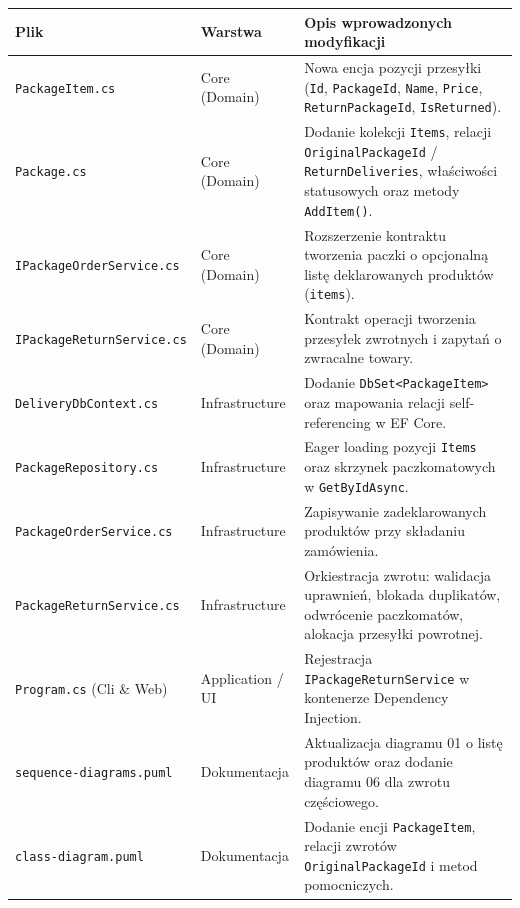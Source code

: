 \documentclass[10.5pt,a4paper]{article}
\begin{document}
\begin{table}[h!]
\centering
\footnotesize
\begin{tabularx}{\textwidth}{l p{3.0cm} X}
\toprule
\textbf{Plik} & \textbf{Warstwa} & \textbf{Opis wprowadzonych modyfikacji} \\
\midrule
\texttt{PackageItem.cs} & Core (Domain) & Nowa encja pozycji przesyłki (\texttt{Id}, \texttt{PackageId}, \texttt{Name}, \texttt{Price}, \texttt{ReturnPackageId}, \texttt{IsReturned}). \\
\addlinespace
\texttt{Package.cs} & Core (Domain) & Dodanie kolekcji \texttt{Items}, relacji \texttt{OriginalPackageId} / \texttt{ReturnDeliveries}, właściwości statusowych oraz metody \texttt{AddItem()}. \\
\addlinespace
\texttt{IPackageOrderService.cs} & Core (Domain) & Rozszerzenie kontraktu tworzenia paczki o opcjonalną listę deklarowanych produktów (\texttt{items}). \\
\addlinespace
\texttt{IPackageReturnService.cs} & Core (Domain) & Kontrakt operacji tworzenia przesyłek zwrotnych i zapytań o zwracalne towary. \\
\addlinespace
\texttt{DeliveryDbContext.cs} & Infrastructure & Dodanie \texttt{DbSet<PackageItem>} oraz mapowania relacji self-referencing w EF Core. \\
\addlinespace
\texttt{PackageRepository.cs} & Infrastructure & Eager loading pozycji \texttt{Items} oraz skrzynek paczkomatowych w \texttt{GetByIdAsync}. \\
\addlinespace
\texttt{PackageOrderService.cs} & Infrastructure & Zapisywanie zadeklarowanych produktów przy składaniu zamówienia. \\
\addlinespace
\texttt{PackageReturnService.cs} & Infrastructure & Orkiestracja zwrotu: walidacja uprawnień, blokada duplikatów, odwrócenie paczkomatów, alokacja przesyłki powrotnej. \\
\addlinespace
\texttt{Program.cs} (Cli \& Web) & Application / UI & Rejestracja \texttt{IPackageReturnService} w kontenerze Dependency Injection. \\
\addlinespace
\texttt{sequence-diagrams.puml} & Dokumentacja & Aktualizacja diagramu 01 o listę produktów oraz dodanie diagramu 06 dla zwrotu częściowego. \\
\addlinespace
\texttt{class-diagram.puml} & Dokumentacja & Dodanie encji \texttt{PackageItem}, relacji zwrotów \texttt{OriginalPackageId} i metod pomocniczych. \\
\bottomrule
\end{tabularx}
\end{table}
\end{document}

